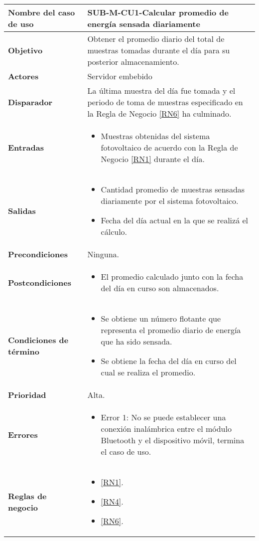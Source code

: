 \begin{longtable}{|J{5cm}|J{10.3cm}|}
	\hline
	\textbf{Nombre del caso de uso} &
		SUB-M-CU1-Calcular promedio de energía sensada diariamente \\ \hline
	\textbf{Objetivo} &
		Obtener el promedio diario del total de muestras tomadas durante el día para su posterior almacenamiento. \\ \hline
	\textbf{Actores} &
		Servidor embebido \\ \hline 
	\textbf{Disparador} & 
		La última muestra del día fue tomada y el periodo de toma de muestras especificado en la Regla de Negocio \ref{RN6} ha culminado. \\ \hline 
	\textbf{Entradas} & 
		\begin{itemize}
				\item Muestras obtenidas del sistema fotovoltaico de acuerdo con la Regla de Negocio \ref{RN1} durante el día.
		\end{itemize}\\ \hline 
	\textbf{Salidas} & 
		\begin{itemize}
			\item Cantidad promedio de muestras sensadas diariamente por el sistema fotovoltaico.
			\item Fecha del día actual en la que se realizá el cálculo.
		\end{itemize} \\ \hline
	\textbf{Precondiciones} &
		Ninguna.\\ \hline
	\textbf{Postcondiciones} &
		\begin{itemize}
			\item El promedio calculado junto con la fecha del día en curso son almacenados.
		\end{itemize}\\ \hline
	\textbf{Condiciones de término} & 
		\begin{itemize}
			\item Se obtiene un número flotante que representa el promedio diario de energía que ha sido sensada.
			\item Se obtiene la fecha del día en curso del cual se realiza el promedio.
		\end{itemize} \\ \hline 
	\textbf{Prioridad} & 
		Alta. \\ \hline
	\textbf{Errores} & 
		\begin{itemize}
			\item \label{SUB-M-CU1:Error1} Error 1: No se puede establecer una conexión inalámbrica entre el módulo Bluetooth y el dispositivo móvil, termina el caso de uso.
		\end{itemize} \\ \hline
	\textbf{Reglas de negocio} & 
		\begin{itemize}
		    \item \ref{RN1}.
			\item \ref{RN4}.
			\item \ref{RN6}.
		\end{itemize} \\ \hline

\end{longtable}

